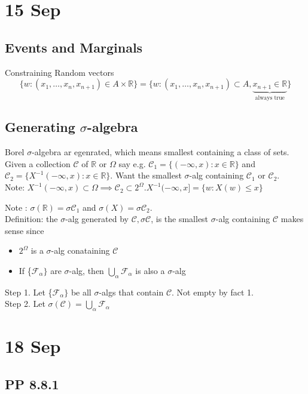 \documentclass[11pt]{article}
\begin{document}
\section{15 Sep}
\subsection{Events and Marginals} 
Constraining Random vectors 
\[
    \{w:(x_1, \hdots , x_n, x_{n+1}) \in A \times \mathbb{R}\} = \{w:(x_1, \hdots , x_n, x_{n+1}) \subset A, \underbrace{x_{n+1} \in \mathbb{R}}_{\text{always true}} \} 
\]
\subsection{Generating $\sigma$-algebra}
Borel $\sigma$-algebra ar egenrated, which means smallest containing a class of sets. \\
Given a collection $\mathcal{C}$ of $\mathbb{R}$ or $\Omega$ say e.g. $\mathcal{C}_1 = \{ (-\infty, x): x \in \mathbb{R} \}$ and 
$\mathcal{C}_2 = \{ X^{-1}(-\infty, x): x \in \mathbb{R} \}$. Want the smallest $\sigma$-alg containing $\mathcal{C}_1$ or $\mathcal{C}_2$. \\

Note: $X^{-1}(-\infty, x) \subset \Omega \implies \mathcal{C}_2 \subset 2^\Omega. 
X^{-1}(-\infty, x] = \{w:X(w)\le x\}$

Note : $\sigma(\mathbb{R}) = \sigma{\mathcal{C}_1}$ and $\sigma(X) = \sigma{\mathcal{C}_2}$. \\
Definition: the $\sigma$-alg generated by $\mathcal{C}, \sigma{\mathcal{C}}$, is the smallest $\sigma$-alg containing 
$\mathcal{C}$ makes sense since
\begin{itemize}
    \item $2^\Omega$ is a $\sigma$-alg conataining $\mathcal{C}$
    \item If \{$\mathcal{F}_\alpha\}$ are $\sigma$-alg, then $\bigcup_\alpha \mathcal{F}_\alpha$ is also a $\sigma$-alg 
\end{itemize}
Step 1. Let \{$\mathcal{F}_\alpha\}$ be all $\sigma$-algs that contain $\mathcal{C}$. Not empty by fact 1. \\
Step 2. Let $\sigma(\mathcal{C}) = \bigcup_\alpha \mathcal{F}_\alpha$
\section{18 Sep}
\subsection{PP 8.8.1}
\end{document}
